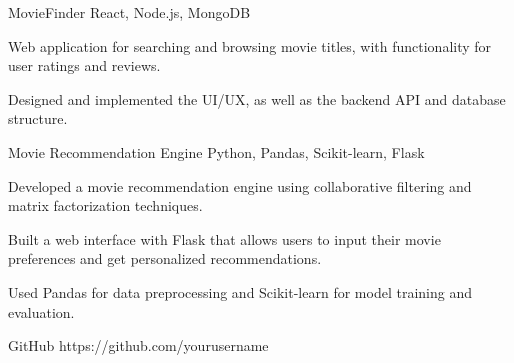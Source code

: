 \begin{cv}
\begin{cvskills}%
\end{cvskills}

\begin{cvprojects}%
\cvproject
    {MovieFinder}
    {React, Node.js, MongoDB}
    \begin{cvdescription}
        \item Web application for searching and browsing movie titles, with functionality for user ratings and reviews.
        \item Designed and implemented the UI/UX, as well as the backend API and database structure.
    \end{cvdescription}

\cvproject
    {Movie Recommendation Engine}
    {Python, Pandas, Scikit-learn, Flask}
    \begin{cvdescription}
        \item Developed a movie recommendation engine using collaborative filtering and matrix factorization techniques.
        \item Built a web interface with Flask that allows users to input their movie preferences and get personalized recommendations.
        \item Used Pandas for data preprocessing and Scikit-learn for model training and evaluation.
    \end{cvdescription}
\end{cvprojects}

\begin{cvlinks}%
\cvlink
    {GitHub}
    {https://github.com/yourusername}
\end{cvlinks}

\end{cv}